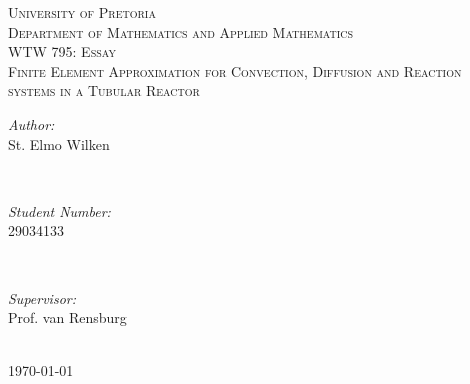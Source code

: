 \begin{titlepage}

\center %
 

\textsc{\LARGE University of Pretoria}\\[1.5cm] %
\textsc{\Large Department of Mathematics and Applied Mathematics}\\[0.5cm] %
\textsc{\large WTW 795: Essay}\\[3.5cm] %



\huge \textsc{Finite Element Approximation for Convection, Diffusion and Reaction systems in a Tubular Reactor} \\[3.5cm]
 

\begin{minipage}{0.4\textwidth}
\begin{flushleft} \large
\emph{Author:}\\
St. Elmo Wilken %
\end{flushleft}
\end{minipage}
~
\begin{minipage}{0.4\textwidth}
\begin{flushright} \large
\emph{Student Number:} \\
29034133 
\end{flushright}
\end{minipage}\\[2cm]

\begin{minipage}{0.4\textwidth}
\begin{center} \large
\emph{Supervisor:} \\
Prof. van Rensburg %
\end{center}
\end{minipage} \\[2cm]


{\large \today}\\[3cm] %

\vfill %

\end{titlepage}
